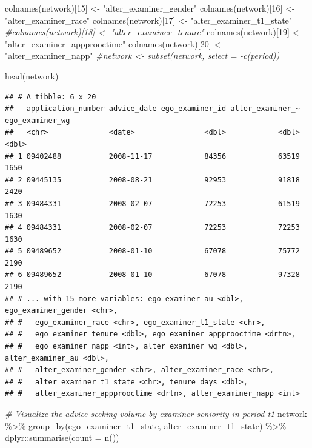 \documentclass[
]{article}
\newenvironment{Shaded}{\begin{snugshade}}{\end{snugshade}}
\newcommand{\AttributeTok}[1]{\textcolor[rgb]{0.77,0.63,0.00}{#1}}
\newcommand{\CommentTok}[1]{\textcolor[rgb]{0.56,0.35,0.01}{\textit{#1}}}
\newcommand{\DecValTok}[1]{\textcolor[rgb]{0.00,0.00,0.81}{#1}}
\newcommand{\FunctionTok}[1]{\textcolor[rgb]{0.00,0.00,0.00}{#1}}
\newcommand{\NormalTok}[1]{#1}
\newcommand{\OtherTok}[1]{\textcolor[rgb]{0.56,0.35,0.01}{#1}}
\newcommand{\SpecialCharTok}[1]{\textcolor[rgb]{0.00,0.00,0.00}{#1}}
\newcommand{\StringTok}[1]{\textcolor[rgb]{0.31,0.60,0.02}{#1}}
\begin{document}
\begin{Shaded}
\begin{Highlighting}[]
\FunctionTok{colnames}\NormalTok{(network)[}\DecValTok{15}\NormalTok{] }\OtherTok{\textless{}{-}} \StringTok{"alter\_examiner\_gender"}
\FunctionTok{colnames}\NormalTok{(network)[}\DecValTok{16}\NormalTok{] }\OtherTok{\textless{}{-}} \StringTok{"alter\_examiner\_race"}
\FunctionTok{colnames}\NormalTok{(network)[}\DecValTok{17}\NormalTok{] }\OtherTok{\textless{}{-}} \StringTok{"alter\_examiner\_t1\_state"}
\CommentTok{\#colnames(network)[18] \textless{}{-} "alter\_examiner\_tenure"}
\FunctionTok{colnames}\NormalTok{(network)[}\DecValTok{19}\NormalTok{] }\OtherTok{\textless{}{-}} \StringTok{"alter\_examiner\_appprooctime"}
\FunctionTok{colnames}\NormalTok{(network)[}\DecValTok{20}\NormalTok{] }\OtherTok{\textless{}{-}} \StringTok{"alter\_examiner\_napp"}
\CommentTok{\#network \textless{}{-} subset(network, select = {-}c(period))}

\FunctionTok{head}\NormalTok{(network)}
\end{Highlighting}
\end{Shaded}

\begin{verbatim}
## # A tibble: 6 x 20
##   application_number advice_date ego_examiner_id alter_examiner_~ ego_examiner_wg
##   <chr>              <date>                <dbl>            <dbl>           <dbl>
## 1 09402488           2008-11-17            84356            63519            1650
## 2 09445135           2008-08-21            92953            91818            2420
## 3 09484331           2008-02-07            72253            61519            1630
## 4 09484331           2008-02-07            72253            72253            1630
## 5 09489652           2008-01-10            67078            75772            2190
## 6 09489652           2008-01-10            67078            97328            2190
## # ... with 15 more variables: ego_examiner_au <dbl>, ego_examiner_gender <chr>,
## #   ego_examiner_race <chr>, ego_examiner_t1_state <chr>,
## #   ego_examiner_tenure <dbl>, ego_examiner_appprooctime <drtn>,
## #   ego_examiner_napp <int>, alter_examiner_wg <dbl>, alter_examiner_au <dbl>,
## #   alter_examiner_gender <chr>, alter_examiner_race <chr>,
## #   alter_examiner_t1_state <chr>, tenure_days <dbl>,
## #   alter_examiner_appprooctime <drtn>, alter_examiner_napp <int>
\end{verbatim}

\begin{Shaded}
\begin{Highlighting}[]
\CommentTok{\# Visualize the advice seeking volume by examiner seniority in period t1}
\NormalTok{  network }\SpecialCharTok{\%\textgreater{}\%} 
  \FunctionTok{group\_by}\NormalTok{(ego\_examiner\_t1\_state, alter\_examiner\_t1\_state) }\SpecialCharTok{\%\textgreater{}\%} 
\NormalTok{  dplyr}\SpecialCharTok{::}\FunctionTok{summarise}\NormalTok{(}\AttributeTok{count =} \FunctionTok{n}\NormalTok{())}
\end{Highlighting}
\end{Shaded}
\end{document}
